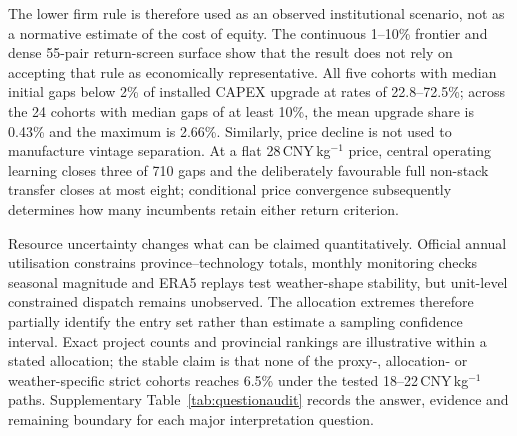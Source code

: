\documentclass[11pt,a4paper]{article}
\begin{document}
The lower firm rule is therefore used as an observed institutional scenario, not as a normative estimate of the cost of equity. The continuous 1--10\% frontier and dense 55-pair return-screen surface show that the result does not rely on accepting that rule as economically representative. All five cohorts with median initial gaps below 2\% of installed CAPEX upgrade at rates of 22.8--72.5\%; across the 24 cohorts with median gaps of at least 10\%, the mean upgrade share is 0.43\% and the maximum is 2.66\%. Similarly, price decline is not used to manufacture vintage separation. At a flat 28\,CNY\,kg$^{-1}$ price, central operating learning closes three of 710 gaps and the deliberately favourable full non-stack transfer closes at most eight; conditional price convergence subsequently determines how many incumbents retain either return criterion.

Resource uncertainty changes what can be claimed quantitatively. Official annual utilisation constrains province--technology totals, monthly monitoring checks seasonal magnitude and ERA5 replays test weather-shape stability, but unit-level constrained dispatch remains unobserved. The allocation extremes therefore partially identify the entry set rather than estimate a sampling confidence interval. Exact project counts and provincial rankings are illustrative within a stated allocation; the stable claim is that none of the proxy-, allocation- or weather-specific strict cohorts reaches 6.5\% under the tested 18--22\,CNY\,kg$^{-1}$ paths. Supplementary Table~\ref{tab:questionaudit} records the answer, evidence and remaining boundary for each major interpretation question.
\end{document}
